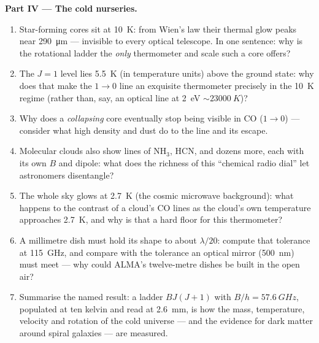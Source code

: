 \begin{problem}
\medskip\noindent\textbf{Part IV --- The cold nurseries.}
\begin{enumerate}[resume]
  \item Star-forming cores sit at \qty{10}{K}: from Wien's law
        their thermal glow peaks near \qty{290}{\micro m} ---
        invisible to every optical telescope. In one sentence: why
        is the rotational ladder the \emph{only} thermometer and
        scale such a core offers?
  \item The $J = 1$ level lies \qty{5.5}{K} (in temperature units)
        above the ground state: why does that make the $1\to0$ line
        an exquisite thermometer precisely in the \qty{10}{K}
        regime (rather than, say, an optical line at
        \qty{2}{eV} $\sim \qty{23000}{K}$)?
  \item Why does a \emph{collapsing} core eventually stop being
        visible in CO ($1\to0$) --- consider what high density and
        dust do to the line and its escape.
  \item Molecular clouds also show lines of NH$_3$, HCN, and dozens
        more, each with its own $B$ and dipole: what does the
        richness of this ``chemical radio dial'' let astronomers
        disentangle?
  \item The whole sky glows at \qty{2.7}{K} (the cosmic microwave
        background): what happens to the contrast of a cloud's CO
        lines as the cloud's own temperature approaches
        \qty{2.7}{K}, and why is that a hard floor for this
        thermometer?
  \item A millimetre dish must hold its shape to about
        $\lambda/20$: compute that tolerance at \qty{115}{GHz},
        and compare with the tolerance an optical mirror
        (\qty{500}{nm}) must meet --- why could ALMA's
        twelve-metre dishes be built in the open air?
  \item Summarise the named result: a ladder $BJ(J+1)$ with $B/h =
        \qty{57.6}{GHz}$, populated at ten kelvin and read at
        \qty{2.6}{mm}, is how the mass, temperature, velocity and
        rotation of the cold universe --- and the evidence for dark
        matter around spiral galaxies --- are measured.
\end{enumerate}
\end{problem}
